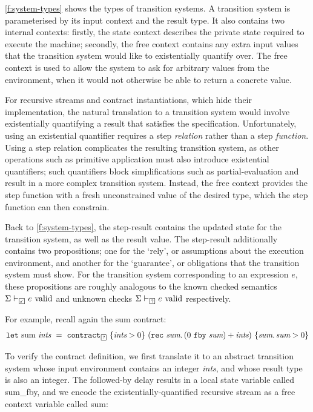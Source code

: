 \documentclass[a4paper,UKenglish,cleveref, autoref, thm-restate,anonymous]{lipics-v2021}
\begin{document}
\autoref{f:system-types} shows the types of transition systems.
A transition system is parameterised by its input context and the result type.
It also contains two internal contexts: firstly, the state context describes the private state required to execute the machine; secondly, the free context contains any extra input values that the transition system would like to existentially quantify over.
The free context is used to allow the system to ask for arbitrary values from the environment, when it would not otherwise be able to return a concrete value.


For recursive streams and contract instantiations, which hide their implementation, the natural translation to a transition system would involve existentially quantifying a result that satisfies the specification.
Unfortunately, using an existential quantifier requires a step \emph{relation} rather than a step \emph{function}.
Using a step relation complicates the resulting transition system, as other operations such as primitive application must also introduce existential quantifiers; such quantifiers block simplifications such as partial-evaluation and result in a more complex transition system.
Instead, the free context provides the step function with a fresh unconstrained value of the desired type, which the step function can then constrain.

Back to \autoref{f:system-types}, the step-result contains the updated state for the transition system, as well as the result value.
The step-result additionally contains two propositions; one for the `rely', or assumptions about the execution environment, and another for the `guarantee', or obligations that the transition system must show.
For the transition system corresponding to an expression $e$, these propositions are roughly analogous to the known checked semantics $\semcheck{\Sigma}{\PSValid}{e}$ and unknown checks $\semcheck{\Sigma}{\PSUnknown}{e}$ respectively.

For example, recall again the sum contract:
$$
\tt{let}~\text{sum}~\textit{ints}~=~\sumcontractX{\PSUnknown}{\textit{ints}}
$$

To verify the contract definition, we first translate it to an abstract transition system whose input environment contains an integer \emph{ints}, and whose result type is also an integer.
The followed-by delay results in a local state variable called sum_fby, and we encode the existentially-quantified recursive stream as a free context variable called sum:
\end{document}
